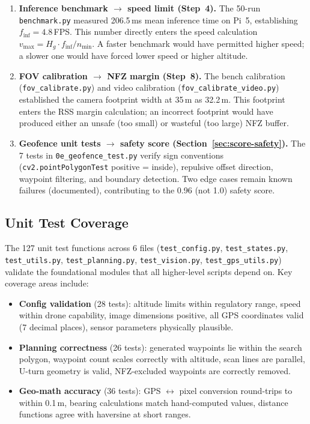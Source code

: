 \documentclass[10pt,a4paper]{article}
\begin{document}
\begin{enumerate}[nosep]
  \item \textbf{Inference benchmark $\to$ speed limit (Step~4).} The 50-run \texttt{benchmark.py} measured 206.5\,ms mean inference time on Pi~5, establishing $f_{\mathrm{inf}} = 4.8$\,FPS. This number directly enters the speed calculation $v_{\max} = H_g \cdot f_{\mathrm{inf}} / n_{\min}$. A faster benchmark would have permitted higher speed; a slower one would have forced lower speed or higher altitude.

  \item \textbf{FOV calibration $\to$ NFZ margin (Step~8).} The bench calibration (\texttt{fov\_calibrate.py}) and video calibration (\texttt{fov\_calibrate\_video.py}) established the camera footprint width at 35\,m as 32.2\,m. This footprint enters the RSS margin calculation; an incorrect footprint would have produced either an unsafe (too small) or wasteful (too large) NFZ buffer.

  \item \textbf{Geofence unit tests $\to$ safety score (Section~\ref{sec:score-safety}).} The 7 tests in \texttt{0e\_geofence\_test.py} verify sign conventions (\texttt{cv2.pointPolygonTest} positive = inside), repulsive offset direction, waypoint filtering, and boundary detection. Two edge cases remain known failures (documented), contributing to the 0.96 (not 1.0) safety score.
\end{enumerate}

\subsection{Unit Test Coverage}

The 127 unit test functions across 6 files (\texttt{test\_config.py}, \texttt{test\_states.py}, \texttt{test\_utils.py}, \texttt{test\_planning.py}, \texttt{test\_vision.py}, \texttt{test\_gps\_utils.py}) validate the foundational modules that all higher-level scripts depend on. Key coverage areas include:

\begin{itemize}[nosep]
  \item \textbf{Config validation} (28 tests): altitude limits within regulatory range, speed within drone capability, image dimensions positive, all GPS coordinates valid (7 decimal places), sensor parameters physically plausible.
  \item \textbf{Planning correctness} (26 tests): generated waypoints lie within the search polygon, waypoint count scales correctly with altitude, scan lines are parallel, U-turn geometry is valid, NFZ-excluded waypoints are correctly removed.
  \item \textbf{Geo-math accuracy} (36 tests): GPS $\leftrightarrow$ pixel conversion round-trips to within 0.1\,m, bearing calculations match hand-computed values, distance functions agree with haversine at short ranges.
\end{itemize}
\end{document}
